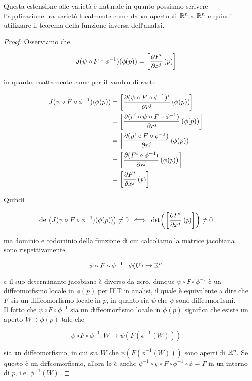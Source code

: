 Questa estensione alle varietà è naturale in quanto possiamo scrivere l'applicazione tra varietà localmente come da un aperto di $ \mathbb{R}^{n} $ a $ \mathbb{R}^{n} $ e quindi utilizzare il teorema della funzione inversa dell'analisi.

\begin{proof}
	Osserviamo che
	
	\begin{equation}
		J(\psi \circ F \circ \phi^{-1})(\phi(p)) = \left[ \pdv{F^{i}}{x^{j}} \, (p) \right]
	\end{equation}

	in quanto, esattamente come per il cambio di carte
	
	\begin{align}
		\begin{split}
			J(\psi \circ F \circ \phi^{-1})(\phi(p)) &= \left[ \pdv{(\psi \circ F \circ \phi^{-1})^{i}}{r^{j}} \, (\phi(p)) \right]\\
			&= \left[ \pdv{(r^{i} \circ \psi \circ F \circ \phi^{-1})}{r^{j}} \, (\phi(p)) \right]\\
			&= \left[ \pdv{(y^{i} \circ F \circ \phi^{-1})}{r^{j}} \, (\phi(p)) \right]\\
			&= \left[ \pdv{(F^{i} \circ \phi^{-1})}{r^{j}} \, (\phi(p)) \right]\\
			&= \left[ \pdv{F^{i}}{x^{j}} \, (p) \right]
		\end{split}
	\end{align}

	Quindi
	
	\begin{equation}
		\det( J(\psi \circ F \circ \phi^{-1})(\phi(p)) ) \neq 0 \, \iff \, \det( \left[ \pdv{F^{i}}{x^{j}} \, (p) \right] ) \neq 0
	\end{equation}

	ma dominio e codominio della funzione di cui calcoliamo la matrice jacobiana sono rispettivamente
	
	\begin{equation}
		\psi \circ F \circ \phi^{-1} : \phi(U) \to \mathbb{R}^{n}
	\end{equation}

	e il suo determinante jacobiano è diverso da zero, dunque $ \psi \circ F \circ \phi^{-1} $ è un diffeomorfismo locale in $ \phi(p) $ per IFT in analisi, il quale è equivalente a dire che $ F $ sia un diffeomorfismo locale in $ p $, in quanto sia $ \psi $ che $ \phi $ sono diffeomorfismi.\\
	Il fatto che $ \psi \circ F \circ \phi^{-1} $ sia un diffeomorfismo locale in $ \phi(p) $ significa che esiste un aperto $ W \ni 
	\phi(p) $ tale che
	
	\begin{equation}
		\psi \circ F \circ \phi^{-1} : W \to \psi(F(\phi^{-1}(W)))
	\end{equation}

	sia un diffeomorfismo, in cui sia $ W $ che $ \psi(F(\phi^{-1}(W))) $ sono aperti di $ \mathbb{R}^{n} $. Se questo è un diffeomorfismo, allora lo è anche $ \psi^{-1} \circ \psi \circ F \circ \phi^{-1} \circ \phi = F $ in un intorno di $ p $, i.e. $ \phi^{-1}(W) $.
\end{proof}

